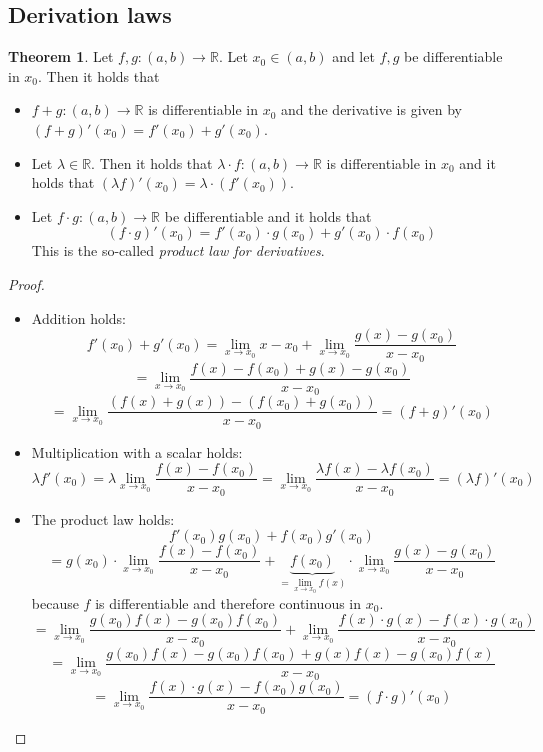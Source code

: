 \documentclass[a4paper,landscape,twocolumn]{article}
\theoremstyle{definition}
\newtheorem{theorem}{Theorem}
\begin{document}
\subsection{Derivation laws}
\begin{theorem}
  Let $f, g: (a, b) \to \mathbb R$.
  Let $x_0 \in (a, b)$ and let $f, g$ be differentiable in $x_0$.
  Then it holds that
  \begin{itemize}
    \item $f + g: (a, b) \to \mathbb R$ is differentiable in $x_0$
      and the derivative is given by $(f + g)'(x_0) = f'(x_0) + g'(x_0)$.
    \item Let $\lambda \in \mathbb R$. Then it holds that
      $\lambda \cdot f: (a, b) \to \mathbb R$ is differentiable in $x_0$
      and it holds that $(\lambda f)'(x_0) = \lambda \cdot (f'(x_0))$.
    \item Let $f \cdot g: (a, b) \to \mathbb R$ be differentiable and
      it holds that
      \[ (f \cdot g)'(x_0) = f'(x_0) \cdot g(x_0) + g'(x_0) \cdot f(x_0) \]
      This is the so-called \emph{product law for derivatives}.
  \end{itemize}
\end{theorem}
\begin{proof}
  \begin{itemize}
    \item Addition holds: \[
        f'(x_0) + g'(x_0)
          = \lim_{x \to x_0} x - x_0 + \lim_{x \to x_0} \frac{g(x) - g(x_0)}{x - x_0}
      \] \[
          = \lim_{x \to x_0} \frac{f(x) - f(x_0) + g(x) - g(x_0)}{x - x_0}
      \] \[
          = \lim_{x \to x_0} \frac{(f(x) + g(x)) - (f(x_0) + g(x_0))}{x - x_0}
          = (f + g)'(x_0)
      \]
    \item Multiplication with a scalar holds:
      \[
        \lambda f'(x_0)
        = \lambda \lim_{x \to x_0} \frac{f(x) - f(x_0)}{x - x_0}
        = \lim_{x \to x_0} \frac{\lambda f(x) - \lambda f(x_0)}{x - x_0}
        = (\lambda f)'(x_0)
      \]
    \item The product law holds:
      \[
        f'(x_0) g(x_0) + f(x_0) g'(x_0)
      \] \[
        = g(x_0) \cdot \lim_{x \to x_0} \frac{f(x) - f(x_0)}{x - x_0}
        + \underbrace{f(x_0)}_{= \lim_{x\to x_0} f(x)} \cdot \lim_{x \to x_0} \frac{g(x) - g(x_0)}{x - x_0}
      \]
      because $f$ is differentiable and therefore continuous in $x_0$.
      \[
        = \lim_{x \to x_0} \frac{g(x_0) f(x) - g(x_0) f(x_0)}{x - x_0}
        + \lim_{x \to x_0} \frac{f(x) \cdot g(x) - f(x) \cdot g(x_0)}{x - x_0}
      \] \[
        = \lim_{x \to x_0} \frac{g(x_0) f(x) - g(x_0) f(x_0) + g(x) f(x) - g(x_0) f(x)}{x - x_0}
      \] \[
        = \lim_{x \to x_0} \frac{f(x) \cdot g(x) - f(x_0) g(x_0)}{x - x_0}
        = (f \cdot g)'(x_0)
      \]
  \end{itemize}
\end{proof}
\end{document}
